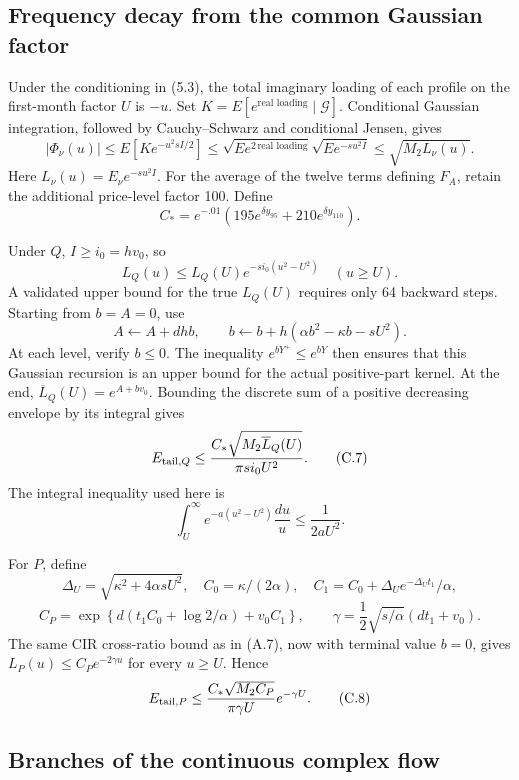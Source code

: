 \subsection{Frequency decay from the common Gaussian factor}

Under the conditioning in (5.3), the total imaginary loading of each profile on the first-month factor \(U\) is \(-u\). Set \(K=E[e^{\text{real loading}}\mid\mathcal G]\). Conditional Gaussian integration, followed by Cauchy--Schwarz and conditional Jensen, gives
\[
|\Phi_\nu(u)|
\le E[K e^{-u^2sI/2}]
\le\sqrt{E e^{2\,\text{real loading}}}
\sqrt{E e^{-su^2I}}
\le\sqrt{M_2L_\nu(u)}.
\tag{C.5}
\]
Here \(L_\nu(u)=E_\nu e^{-su^2I}\). For the average of the twelve terms defining \(F_A\), retain the additional price-level factor 100. Define
\[
C_*=
e^{-.01}\left(195e^{\delta y_{95}}+210e^{\delta y_{110}}\right).
\]

Under \(Q\), \(I\ge i_0=hv_0\), so
\[
L_Q(u)\le L_Q(U)e^{-si_0(u^2-U^2)}\quad(u\ge U).
\]
A validated upper bound for the true \(L_Q(U)\) requires only 64 backward steps. Starting from \(b=A=0\), use
\[
A\leftarrow A+dhb,\qquad
b\leftarrow b+h(\alpha b^2-\kappa b-sU^2).
\tag{C.6}
\]
At each level, verify \(b\le0\). The inequality \(e^{bY^+}\le e^{bY}\) then ensures that this Gaussian recursion is an upper bound for the actual positive-part kernel. At the end, \(\overline L_Q(U)=e^{A+bv_0}\). Bounding the discrete sum of a positive decreasing envelope by its integral gives
\[
E_{{\rm tail},Q}\le
\frac{C_*\sqrt{M_2\overline L_Q(U)}}{\pi s i_0U^2}.
\tag{C.7}
\]
The integral inequality used here is
\[
\int_U^\infty e^{-a(u^2-U^2)}\frac{du}{u}\le\frac1{2aU^2}.
\]

For \(P\), define
\[
\Delta_U=\sqrt{\kappa^2+4\alpha sU^2},\quad
C_0=\kappa/(2\alpha),\quad
C_1=C_0+\Delta_Ue^{-\Delta_Ut_1}/\alpha,
\]
\[
C_P=\exp\!\left\{
d(t_1C_0+\log2/\alpha)+v_0C_1\right\},\qquad
\gamma=\frac12\sqrt{s/\alpha}(dt_1+v_0).
\]
The same CIR cross-ratio bound as in (A.7), now with terminal value \(b=0\), gives \(L_P(u)\le C_Pe^{-2\gamma u}\) for every \(u\ge U\). Hence
\[
E_{{\rm tail},P}\le
\frac{C_*\sqrt{M_2C_P}}{\pi\gamma U}e^{-\gamma U}.
\tag{C.8}
\]

\subsection{Branches of the continuous complex flow}

